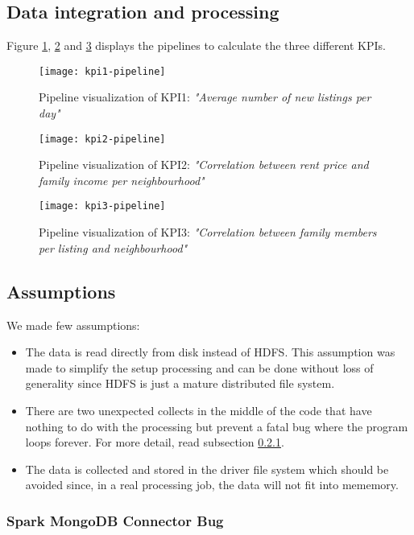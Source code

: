 \documentclass[12pt, a4paper]{article}
\begin{document}
\subsection{Data integration and processing}

Figure \ref{fig:KPI1}, \ref{fig:KPI2} and \ref{fig:KPI3} displays the pipelines to calculate the three different KPIs.

\begin{figure}[H]
\centering
\texttt{[image: kpi1-pipeline]}
\caption{Pipeline visualization of KPI1: \emph{"Average number of new listings per day"}}
\label{fig:KPI1}
\end{figure}

\begin{figure}[H]
\centering
\texttt{[image: kpi2-pipeline]}
\caption{Pipeline visualization of KPI2: \emph{"Correlation between rent price and family income per neighbourhood"}}
\label{fig:KPI2}
\end{figure}

\begin{figure}[H]
\centering
\texttt{[image: kpi3-pipeline]}
\caption{Pipeline visualization of KPI3: \emph{"Correlation between family members per listing and neighbourhood"}}
\label{fig:KPI3}
\end{figure}

\subsection{Assumptions}

We made few assumptions:

\begin{itemize}
    \item The data is read directly from disk instead of HDFS. This assumption was made to simplify the setup processing and can be done without loss of generality since HDFS is just a mature distributed file system.
    \item There are two unexpected collects in the middle of the code that have nothing to do with the processing but prevent a fatal bug where the program loops forever. For more detail, read subsection \ref{subsubsection:mongodb}.
    \item The data is collected and stored in the driver file system which should be avoided since, in a real processing job, the data will not fit into mememory.
\end{itemize}

\subsubsection{Spark MongoDB Connector Bug}\label{subsubsection:mongodb}
\end{document}

